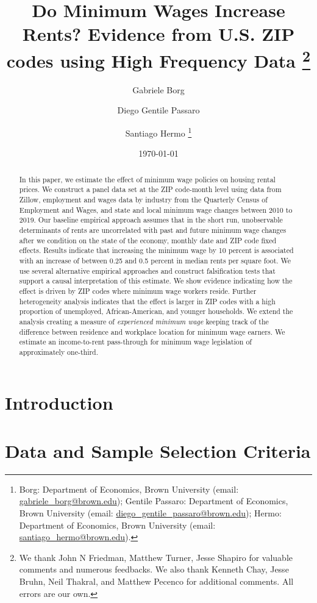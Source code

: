 \documentclass{article}
\title{Do Minimum Wages Increase Rents? 
	   Evidence from U.S. ZIP codes using High Frequency Data 
	   \thanks{We thank John N Friedman, Matthew Turner, Jesse Shapiro for valuable comments and 
   numerous feedbacks. We also thank Kenneth Chay, Jesse Bruhn, Neil Thakral, and Matthew Pecenco for additional 
   comments. All errors are our own.}}
\author{Gabriele Borg \and Diego Gentile Passaro \and Santiago Hermo
		\footnote{Borg: Department of Economics, Brown University (email: 
		\url{gabriele_borg@brown.edu}); 
		Gentile Passaro: Department of Economics, Brown University (email: 
		\url{diego_gentile_passaro@brown.edu}); 
		Hermo: Department of Economics, Brown University (email: 
		\url{santiago_hermo@brown.edu}).}
		}
\date{\today}
\begin{document}
\maketitle

\begin{abstract}
    \noindent
    In this paper, we estimate the effect of minimum wage policies on housing rental 
    prices. We construct a panel data set at the ZIP code-month level using 
    data from Zillow, employment and wages data by industry  from the Quarterly Census of 
    Employment and Wages, and state and local minimum wage changes between 2010 to 2019. 
    Our baseline empirical approach assumes that in the short run, unobservable determinants of 
    rents are uncorrelated with past and future minimum wage changes after we condition on  
    the state of the economy, monthly date and ZIP code fixed effects.  Results indicate that increasing 
    the minimum wage by 10 percent is associated with an increase of between 0.25 and 0.5 percent in 
    median rents per square foot. We use several alternative empirical approaches and construct 
    falsification tests that support a causal interpretation of this estimate. We show 
    evidence indicating how the effect is driven by ZIP codes where minimum wage workers 
    reside. Further heterogeneity analysis indicates that the effect is larger in ZIP codes 
    with a high proportion of unemployed, African-American, and younger households. We 
    extend the analysis creating a measure of \textit{experienced minimum wage} keeping track 
    of the difference between residence and workplace location for minimum wage earners. We 
    estimate an income-to-rent pass-through for minimum wage legislation of approximately one-third. 
\end{abstract}

\vspace{5mm}

\maketitle


\clearpage

\section{Introduction}\label{sec:intro}
    

\section{Data and Sample Selection Criteria}\label{sec:data}
	
\end{document}
